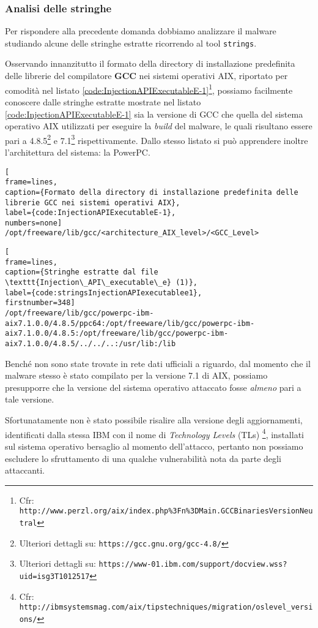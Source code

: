 \documentclass[10pt,a4paper, titlepage]{report}
\begin{document}
\subsubsection{Analisi delle stringhe}\label{subsection:InjectionAPIExecutableE}

Per rispondere alla precedente domanda dobbiamo analizzare il malware studiando alcune delle stringhe estratte ricorrendo al tool \texttt{strings}.

Osservando innanzitutto il formato della directory di installazione predefinita delle librerie del compilatore \textbf{GCC} nei sistemi operativi AIX, riportato per comodità nel listato \ref{code:InjectionAPIExecutableE-1}\footnote{Cfr: \texttt{http://www.perzl.org/aix/index.php\%3Fn\%3DMain.GCCBinariesVersionNeutral}}, possiamo facilmente conoscere dalle stringhe estratte mostrate nel listato \ref{code:InjectionAPIExecutableE-1} sia la versione di GCC che quella del sistema operativo AIX utilizzati per eseguire la \textit{build} del malware, le quali risultano essere pari a 4.8.5\footnote{Ulteriori dettagli su: \texttt{https://gcc.gnu.org/gcc-4.8/}} e 7.1\footnote{Ulteriori dettagli su: \texttt{https://www-01.ibm.com/support/docview.wss?uid=isg3T1012517}} rispettivamente. Dallo stesso listato si può apprendere inoltre l'architettura del sistema: la PowerPC\texttrademark.

\begin{lstlisting}[
frame=lines, 
caption={Formato della directory di installazione predefinita delle librerie GCC nei sistemi operativi AIX}, 
label={code:InjectionAPIExecutableE-1},
numbers=none]
/opt/freeware/lib/gcc/<architecture_AIX_level>/<GCC_Level>
\end{lstlisting}

\begin{lstlisting}[
frame=lines, 
caption={Stringhe estratte dal file \texttt{Injection\_API\_executable\_e} (1)}, 
label={code:stringsInjectionAPIexecutablee1},
firstnumber=348]
/opt/freeware/lib/gcc/powerpc-ibm-aix7.1.0.0/4.8.5/ppc64:/opt/freeware/lib/gcc/powerpc-ibm-aix7.1.0.0/4.8.5:/opt/freeware/lib/gcc/powerpc-ibm-aix7.1.0.0/4.8.5/../../..:/usr/lib:/lib
\end{lstlisting}

Benché non sono state trovate in rete dati ufficiali a riguardo, dal momento che il malware stesso è stato compilato per la versione 7.1 di AIX, possiamo presupporre che la versione del sistema operativo attaccato fosse \textit{almeno} pari a tale versione. 

Sfortunatamente non è stato possibile risalire alla versione degli aggiornamenti, identificati dalla stessa IBM con il nome di \textit{Technology Levels} (TLs) \footnote{Cfr: \texttt{http://ibmsystemsmag.com/aix/tipstechniques/migration/oslevel\_versions/}}, installati sul sistema operativo bersaglio al momento dell'attacco, pertanto non possiamo escludere lo sfruttamento di una qualche vulnerabilità nota da parte degli attaccanti.
\end{document}

